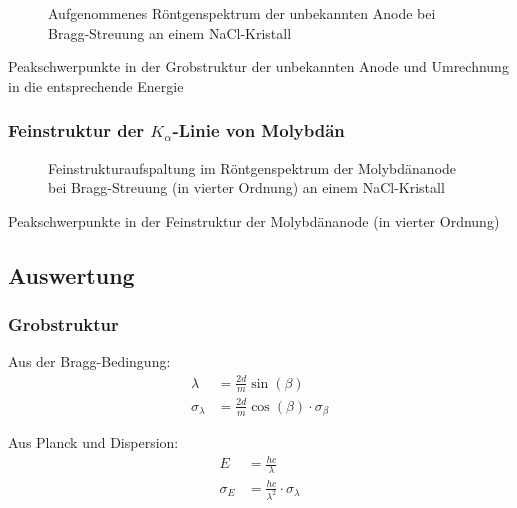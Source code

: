 \documentclass[10pt, a4paper]{article}
\begin{document}
\begin{figure}[!h]
\centering

\caption{Aufgenommenes Röntgenspektrum der unbekannten Anode bei Bragg-Streuung an einem NaCl-Kristall}
\label{fig:anode3}
\end{figure}

\begin{table}[!h]
\centering

\caption{Peakschwerpunkte in der Grobstruktur der unbekannten Anode und Umrechnung in die entsprechende Energie}
\label{fig:peakschwerpunkt_grobstruktur}
\end{table}

\subsubsection{Feinstruktur der $K_\alpha$-Linie von Molybdän}

\begin{figure}[!h]
\centering

\caption{Feinstrukturaufspaltung im Röntgenspektrum der Molybdänanode bei Bragg-Streuung (in vierter Ordnung) an einem NaCl-Kristall}
\label{fig:feinstruktur}
\end{figure}

\begin{table}[!h]
\centering

\caption{Peakschwerpunkte in der Feinstruktur der Molybdänanode (in vierter Ordnung)}
\label{fig:peakschwerpunkt_feinstruktur}
\end{table}


\subsection{Auswertung}

\subsubsection{Grobstruktur}
Aus der Bragg-Bedingung:
\begin{align}
  \lambda &= \frac{2d}{m} \sin(\beta) \\
  \sigma_\lambda &= \frac{2d}{m} \cos(\beta) \cdot \sigma_\beta
\end{align}

Aus Planck und Dispersion:
\begin{align}
  E &= \frac{h c}{\lambda} \\
  \sigma_E &= \frac{h c}{\lambda^2} \cdot \sigma_\lambda
\end{align}
\end{document}
